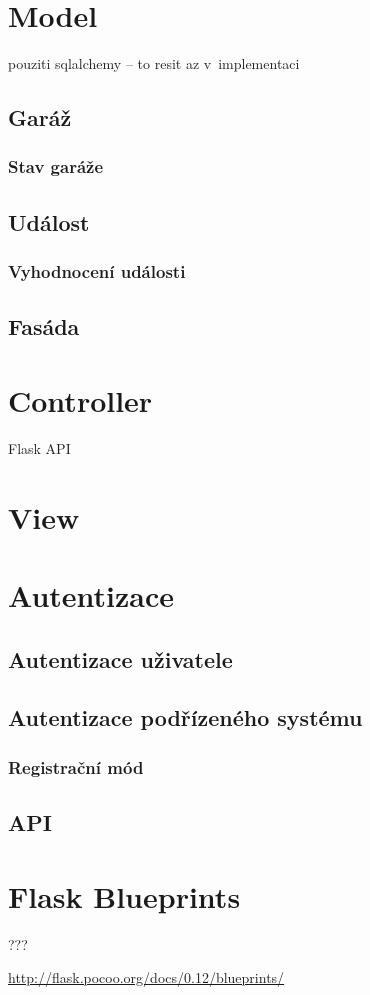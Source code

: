 \section{Model}

pouziti sqlalchemy -- to resit az v~implementaci

\subsection{Garáž}

\subsubsection{Stav garáže}

\subsection{Událost}

\subsubsection{Vyhodnocení události}

\subsection{Fasáda}

\section{Controller}

Flask API

\section{View}

\section{Autentizace}

\subsection{Autentizace uživatele}

\subsection{Autentizace podřízeného systému}

\subsubsection{Registrační mód}

\subsection{API}

\section{Flask Blueprints}

???

\url{http://flask.pocoo.org/docs/0.12/blueprints/}
